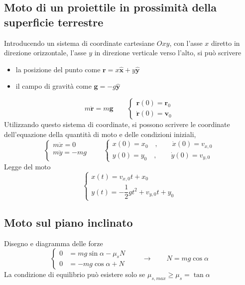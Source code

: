 \subsection{Moto di un proiettile in prossimità della superficie terrestre}
Introducendo un sistema di coordinate cartesiane $Oxy$, con l'asse $x$ diretto in direzione orizzontale, l'asse $y$ in direzione verticale verso l'alto, si può scrivere
\begin{itemize}
    \item la posizione del punto come $\mathbf{r} = x \mathbf{\hat{x}} + y \mathbf{\hat{y}}$
    \item il campo di gravità come $\mathbf{g} = -g \mathbf{\hat{y}}$
\end{itemize}
\begin{equation}
m \ddot{\mathbf{r}} = m \mathbf{g} \qquad
\begin{cases}
    \mathbf{r}(0) = \mathbf{r}_0 \\
    \dot{\mathbf{r}}(0) = \mathbf{v}_0 
\end{cases}
\end{equation}
Utilizzando questo sistema di coordinate, si possono scrivere le coordinate dell'equazione della quantità di moto e delle condizioni iniziali,
\begin{equation}
    \begin{cases}
        m \ddot{x} = 0 \\
        m \ddot{y} = -m g \\
    \end{cases} \qquad
    \begin{cases}
        x(0) = x_0 \quad , \qquad  \dot{x}(0) = v_{x,0} \\
        y(0) = y_0 \quad , \qquad  \dot{y}(0) = v_{y,0}
    \end{cases}
\end{equation}
Legge del moto
\begin{equation}
    \begin{cases}
        x(t) = v_{x,0} t + x_0 \\
        y(t) = -\dfrac{1}{2} g t^2 + v_{y,0} t + y_0
    \end{cases}
\end{equation}

\subsection{Moto sul piano inclinato}
\begin{example}
    {\color{red} Disegno e diagramma delle forze}
\begin{equation}
    \begin{cases}
        0 & = m g \sin \alpha - \mu_s N  \\
        0 & = -m g \cos \alpha + N
    \end{cases} \qquad \rightarrow \qquad
    N = m g \cos \alpha
\end{equation}
La condizione di equilibrio può esistere solo se 
    $\mu_{s, max} \ge \mu_s = \tan \alpha$
\end{example}

